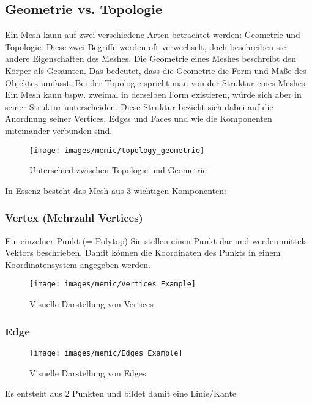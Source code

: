 \subsection{Geometrie vs. Topologie}

Ein Mesh kann auf zwei verschiedene Arten betrachtet werden: Geometrie und Topologie. Diese zwei Begriffe werden oft verwechselt, doch beschreiben sie andere Eigenschaften des Meshes. Die Geometrie eines Meshes beschreibt den Körper als Gesamten. Das bedeutet, dass die Geometrie die Form und Maße des Objektes umfasst. Bei der Topologie spricht man von der Struktur eines Meshes. Ein Mesh kann bspw. zweimal in derselben Form existieren, würde sich aber in seiner Struktur unterscheiden. Diese Struktur bezieht sich dabei auf die Anordnung seiner Vertices, Edges und Faces und wie die Komponenten miteinander verbunden sind.

\begin{figure}[H]
	\centering
	\texttt{[image: images/memic/topology\_geometrie]}
	\caption{Unterschied zwischen Topologie und Geometrie\cite{_geoTopo}}
\end{figure} 

In Essenz besteht das Mesh aus 3 wichtigen Komponenten\cite[2]{_highpoly_to_lowpoly}:

\subsubsection{Vertex (Mehrzahl Vertices)}

 Ein einzelner Punkt (= Polytop)
Sie stellen einen Punkt dar und werden mittels Vektors beschrieben. Damit können die Koordinaten des Punkts in einem Koordinatensystem angegeben werden.\cite[S.47]{_the_essential_guide_to_3D}

\begin{figure}[H]
	\centering
	\texttt{[image: images/memic/Vertices\_Example]}
	\caption{Visuelle Darstellung von Vertices}
\end{figure}

\subsubsection{Edge}

\begin{figure}[H]
	\centering
	\texttt{[image: images/memic/Edges\_Example]}
	\caption{Visuelle Darstellung von Edges}
\end{figure}

Es entsteht aus 2 Punkten und bildet damit eine Linie/Kante

